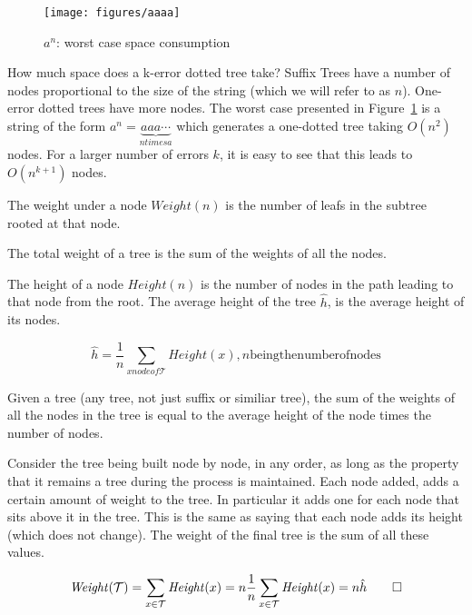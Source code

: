 \begin{figure}
\texttt{[image: figures/aaaa]}
\caption{$a^n$: worst case space consumption}%
\label{fig:aaaa}
\end{figure}

How much space does a k-error dotted tree take? Suffix Trees have a number of nodes proportional to the size of the string (which we will refer to as $n$). One-error dotted trees have more nodes. The worst case presented in Figure~\ref{fig:aaaa} is a string of the form $a^n = \underbrace{aaa\cdots}_{n \mathit{times }a}$ which generates a one-dotted tree taking $O(n^2)$ nodes. For a larger number of errors $k$, it is easy to see that this leads to $O(n^{k+1})$ nodes.

\begin{definition}
The weight under a node $\mathit{Weight}(n)$ is the number of leafs in the subtree rooted at that node.

The total weight of a tree is the sum of the weights of all the nodes.
\end{definition}

\begin{definition}
The height of a node $\mathit{Height}(n)$ is the number of nodes in the path leading to that node from the root. The average height of the tree $\hat{h}$, is the average height of its nodes.

\[ \hat{h} = \frac{1}{n} \sum_{x \mathit{node of \mathcal{T}}} \mathit{Height}(x), n \mathrm{being the number of nodes} \]
\end{definition}

\begin{lemma}
Given a tree (any tree, not just suffix or similiar tree), the sum of the weights of all the nodes in the tree is equal to the average height of the node times the number of nodes.
\end{lemma}

Consider the tree being built node by node, in any order, as long as the property that it remains a tree during the process is maintained. Each node added, adds a certain amount of weight to the tree. In particular it adds one for each node that sits above it in the tree. This is the same as saying that each node adds its height (which does not change). The weight of the final tree is the sum of all these values.

\[ \mathit{Weight}(\mathcal{T}) = \sum_{x \in \mathcal{T}}\mathit{Height}(x) = n\frac{1}{n}\sum_{x \in \mathcal{T}}\mathit{Height}(x) = n\hat{h} \qed \]

